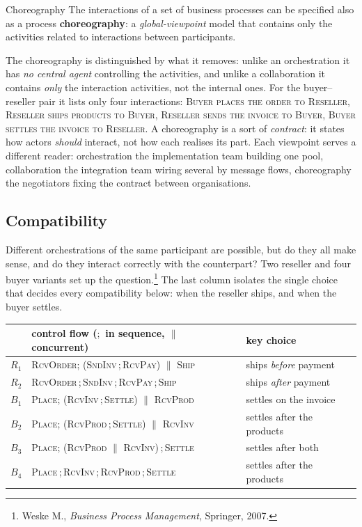 \begin{definitionbox}{Choreography}
The interactions of a set of business processes can be specified also as a process \textbf{choreography}: a \emph{global-viewpoint} model that contains only the activities related to interactions between participants.
\end{definitionbox}

The choreography is distinguished by what it removes: unlike an orchestration it has \emph{no central agent} controlling the activities, and unlike a collaboration it contains \emph{only} the interaction activities, not the internal ones. For the buyer--reseller pair it lists only four interactions: \textsc{Buyer places the order to Reseller}, \textsc{Reseller ships products to Buyer}, \textsc{Reseller sends the invoice to Buyer}, \textsc{Buyer settles the invoice to Reseller}. A choreography is a sort of \emph{contract}: it states how actors \emph{should} interact, not how each realises its part. Each viewpoint serves a different reader: orchestration the implementation team building one pool, collaboration the integration team wiring several by message flows, choreography the negotiators fixing the contract between organisations.

\subsection{Compatibility}

Different orchestrations of the same participant are possible, but do they all make sense, and do they interact correctly with the counterpart? Two reseller and four buyer variants set up the question.\footnote{Weske M., \emph{Business Process Management}, Springer, 2007.} The last column isolates the single choice that decides every compatibility below: when the reseller ships, and when the buyer settles.
\begin{center}
\footnotesize
\begin{tabular}{lll}
\toprule
      & control flow ($;$ in sequence, $\parallel$ concurrent) & key choice \\
\midrule
$R_1$ & \textsc{RcvOrder}; (\textsc{SndInv}\,;\,\textsc{RcvPay}) $\parallel$ \textsc{Ship} & ships \emph{before} payment \\
$R_2$ & \textsc{RcvOrder}\,;\,\textsc{SndInv}\,;\,\textsc{RcvPay}\,;\,\textsc{Ship} & ships \emph{after} payment \\
\midrule
$B_1$ & \textsc{Place}; (\textsc{RcvInv}\,;\,\textsc{Settle}) $\parallel$ \textsc{RcvProd} & settles on the invoice \\
$B_2$ & \textsc{Place}; (\textsc{RcvProd}\,;\,\textsc{Settle}) $\parallel$ \textsc{RcvInv} & settles after the products \\
$B_3$ & \textsc{Place}; (\textsc{RcvProd} $\parallel$ \textsc{RcvInv})\,;\,\textsc{Settle} & settles after both \\
$B_4$ & \textsc{Place}\,;\,\textsc{RcvInv}\,;\,\textsc{RcvProd}\,;\,\textsc{Settle} & settles after the products \\
\bottomrule
\end{tabular}
\end{center}

